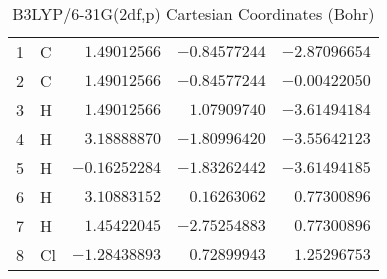 \documentclass[10pt,oneside]{article}
\begin{document}
\begin{table}[h]
\centering
\caption{B3LYP/6-31G(2df,p) Cartesian Coordinates (Bohr)}
\begin{tabular}{llrrr}
\toprule
1  & C  & $ 1.49012566$ & $-0.84577244$ & $-2.87096654$ \\
2  & C  & $ 1.49012566$ & $-0.84577244$ & $-0.00422050$ \\
3  & H  & $ 1.49012566$ & $ 1.07909740$ & $-3.61494184$ \\
4  & H  & $ 3.18888870$ & $-1.80996420$ & $-3.55642123$ \\
5  & H  & $-0.16252284$ & $-1.83262442$ & $-3.61494185$ \\
6  & H  & $ 3.10883152$ & $ 0.16263062$ & $ 0.77300896$ \\
7  & H  & $ 1.45422045$ & $-2.75254883$ & $ 0.77300896$ \\
8  & Cl & $-1.28438893$ & $ 0.72899943$ & $ 1.25296753$ \\
\bottomrule
\end{tabular}
\end{table}
\end{document}
